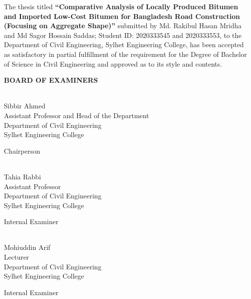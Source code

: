 \documentclass[12pt,a4paper]{article}
\begin{document}
The thesis titled \textbf{``Comparative Analysis of Locally Produced Bitumen and Imported Low-Cost Bitumen for Bangladesh Road Construction (Focusing on Aggregate Shape)''} submitted by Md. Rakibul Hasan Mridha and Md Sagor Hossain Saddas; Student ID: 2020333545 and 2020333553, to the Department of Civil Engineering, Sylhet Engineering College, has been accepted as satisfactory in partial fulfillment of the requirement for the Degree of Bachelor of Science in Civil Engineering and approved as to its style and contents.

\vspace{0.8cm}

\begin{center}
    \textbf{BOARD OF EXAMINERS}
\end{center}

\vspace{0.8cm}

\noindent
\begin{minipage}[t]{0.70\textwidth}
    \noindent\makebox[2.5in]{\hrulefill} \\
    Sibbir Ahmed \\
    Assistant Professor and Head of the Department \\
    Department of Civil Engineering \\
    Sylhet Engineering College
\end{minipage}
\hfill
\begin{minipage}[t]{0.28\textwidth}
    \raggedleft
    Chairperson
\end{minipage}

\vspace{0.8cm}

\noindent
\begin{minipage}[t]{0.70\textwidth}
    \noindent\makebox[2.5in]{\hrulefill} \\
    Tahia Rabbi \\
    Assistant Professor \\
    Department of Civil Engineering \\
    Sylhet Engineering College
\end{minipage}
\hfill
\begin{minipage}[t]{0.28\textwidth}
    \raggedleft
    Internal Examiner
\end{minipage}

\vspace{0.8cm}

\noindent
\begin{minipage}[t]{0.70\textwidth}
    \noindent\makebox[2.5in]{\hrulefill} \\
    Mohiuddin Arif \\
    Lecturer \\
    Department of Civil Engineering \\
    Sylhet Engineering College
\end{minipage}
\hfill
\begin{minipage}[t]{0.28\textwidth}
    \raggedleft
    Internal Examiner
\end{minipage}
\end{document}
